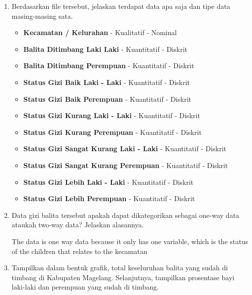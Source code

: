 \documentclass[12pt,titlepage]{article}
\begin{document}
\begin{enumerate}
    \item {
        Berdasarkan file tersebut, jelaskan terdapat data apa saja dan tipe data masing-masing sata.
        \begin{itemize}
            \item \textbf{Kecamatan / Kelurahan} - Kualitatif - Nominal
            \item \textbf{Balita Ditimbang Laki Laki} - Kuantitatif - Diskrit
            \item \textbf{Balita Ditimbang Perempuan} - Kuantitatif - Diskrit
            \item \textbf{Status Gizi Baik Laki - Laki} - Kuantitatif - Diskrit
            \item \textbf{Status Gizi Baik Perempuan} - Kuantitatif - Diskrit
            \item \textbf{Status Gizi Kurang Laki - Laki} - Kuantitatif - Diskrit
            \item \textbf{Status Gizi Kurang Perempuan} - Kuantitatif - Diskrit
            \item \textbf{Status Gizi Sangat Kurang Laki - Laki} - Kuantitatif - Diskrit
            \item \textbf{Status Gizi Sangat Kurang Perempuan} - Kuantitatif - Diskrit
            \item \textbf{Status Gizi Lebih Laki - Laki} - Kuantitatif - Diskrit
            \item \textbf{Status Gizi Lebih Perempuan} - Kuantitatif - Diskrit
        \end{itemize}
    }
    \item {
        Data gizi balita tersebut apakah dapat dikategorikan sebagai one-way data ataukah two-way data? Jelaskan alasannya.

        The data is one way data because it only has one variable, which is the status of the children that relates to the kecamatan
    }
    \item {
        Tampilkan dalam bentuk grafik, total keseluruhan balita yang sudah di timbang di Kabupaten Magelang. Selanjutnya, tampilkan prosentase bayi laki-laki dan perempuan yang sudah di timbang.

}
\end{enumerate}
\end{document}
